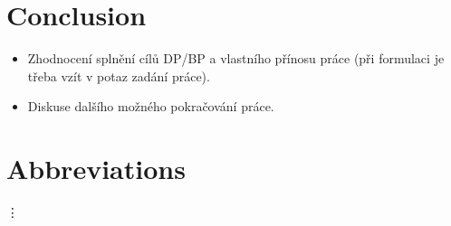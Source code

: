 \documentclass[11pt,twoside,a4paper]{book}
\begin{document}
\chapter{Conclusion}

\begin{itemize}
\item Zhodnocení splnění cílů DP/BP a  vlastního přínosu práce (při formulaci je třeba vzít v potaz zadání práce).
\item Diskuse dalšího možného pokračování práce.

\end{itemize} 	




{
\def\CS{$\cal C\kern-0.1667em\lower.5ex\hbox{$\cal S$}\kern-0.075em $}

}

%


\appendix



\chapter{Abbreviations}

\begin{description}
\item
\end{description}
\vdots

\end{document}
